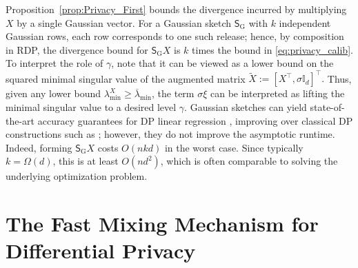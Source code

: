 \documentclass[11pt]{article}
\theoremstyle{definition}
\theoremstyle{plain}
\providecommand{\propositionref}[1]{Proposition~\ref{#1}}
\providecommand{\brI}{\mathbb{I}}
\begin{document}
\propositionref{prop:Privacy_First} bounds the divergence incurred by multiplying \(X\) by a single Gaussian vector. For a Gaussian sketch \(\mathsf{S}_{\mathrm{G}}\) with \(k\) independent Gaussian rows, each row corresponds to one such release; hence, by composition in RDP, the divergence bound for \(\mathsf{S}_{\mathrm{G}}X\) is \(k\) times the bound in \eqref{eq:privacy_calib}. To interpret the role of $\gamma$, note that it can be viewed as a lower bound on the squared minimal singular value of the augmented matrix $\widetilde{X}:= [X^{\top}, \sigma \brI_d]^{\top}.$ Thus, given any lower bound $\lambda^{X}_{\min} \geq \overline{\lambda}_{\min}$, the term $\sigma\xi$ can be interpreted as lifting the minimal singular value to a desired level $\gamma$. Gaussian sketches can yield state-of-the-art accuracy guarantees for DP linear regression \citep{lev2026near}, improving over classical DP constructions such as \citet{wang_adassp}; however, they do not improve the asymptotic runtime. Indeed, forming $\mathsf{S}_{\mathrm{G}}X$ costs $O(nkd)$ in the worst case. Since typically $k=\Omega(d)$, this is at least $O(nd^{2})$, which is often comparable to solving the underlying optimization problem.
 
\section{The Fast Mixing Mechanism for Differential Privacy}
\label{s:fast_mixing}
\end{document}
